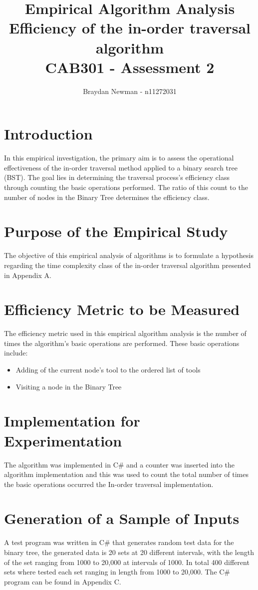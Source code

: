 \documentclass[10pt,a4paper]{report}
\author{Braydan Newman - n11272031}
\title{%
  Empirical Algorithm Analysis \\
   Efficiency of the in-order traversal algorithm  \\
  \large CAB301 - Assessment 2}
\date{}
\begin{document}
\maketitle
\tableofcontents
\pagebreak 

\section{Introduction}
In this empirical investigation, the primary aim is to assess the operational effectiveness of the in-order traversal method applied to a binary search tree (BST). The goal lies in determining the traversal process's efficiency class through counting the basic operations performed. The ratio of this count to the number of nodes in the Binary Tree determines the efficiency class. 

\section{Purpose of the Empirical Study}
The objective of this empirical analysis of algorithms is to formulate a hypothesis regarding the time complexity class of the in-order traversal algorithm presented in Appendix A. 

\section{Efficiency Metric to be Measured}
The efficiency metric used in this empirical algorithm analysis is the number of times the algorithm’s basic operations are performed. These basic operations include: 
\begin{itemize}
	\item Adding of the current node’s tool to the ordered list of tools 
	\item Visiting a node in the Binary Tree  
\end{itemize}

\section{Implementation for Experimentation}
The algorithm was implemented in C\# and a counter was inserted into the algorithm implementation and this was used to count the total number of times the basic operations occurred the In-order traversal  implementation. 

\section{Generation of a Sample of Inputs}
A test program was written in C\# that generates random test data for the binary tree, the generated data is 20 sets at 20 different intervals, with the length of the set ranging from 1000 to 20,000 at intervals of 1000. In total 400 different sets where tested each set ranging in length from 1000 to 20,000. The C\# program can be found in Appendix C. 
\end{document}
